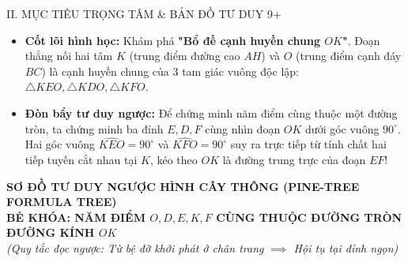 \documentclass[11pt,a4paper]{article}
\begin{document}
\vspace{1mm}

\begin{pedagogybox}{II. MỤC TIÊU TRỌNG TÂM \& BẢN ĐỒ TƯ DUY 9+}
\begin{itemize}[leftmargin=*, nosep]
    \item \textbf{Cốt lõi hình học:} Khám phá \textbf{"Bổ đề cạnh huyền chung $OK$"}. Đoạn thẳng nối hai tâm $K$ (trung điểm đường cao $AH$) và $O$ (trung điểm cạnh đáy $BC$) là cạnh huyền chung của 3 tam giác vuông độc lập: $\triangle KEO, \triangle KDO, \triangle KFO$.
    \item \textbf{Đòn bẩy tư duy ngược:} Để chứng minh năm điểm cùng thuộc một đường tròn, ta chứng minh ba đỉnh $E, D, F$ cùng nhìn đoạn $OK$ dưới góc vuông $90^\circ$. Hai góc vuông $\widehat{KEO} = 90^\circ$ và $\widehat{KFO} = 90^\circ$ suy ra trực tiếp từ tính chất hai tiếp tuyến cắt nhau tại $K$, kéo theo $OK$ là đường trung trực của đoạn $EF$!
\end{itemize}
\end{pedagogybox}

\newpage

\begin{center}
    {\Large\bfseries\color{blue!80!black} SƠ ĐỒ TƯ DUY NGƯỢC HÌNH CÂY THÔNG (PINE-TREE FORMULA TREE)}\\[1.5mm]
    {\large\bfseries BẺ KHÓA: NĂM ĐIỂM $O, D, E, K, F$ CÙNG THUỘC ĐƯỜNG TRÒN ĐƯỜNG KÍNH $OK$}\\[1mm]
    \textit{(Quy tắc đọc ngược: Từ bệ đỡ khởi phát ở chân trang $\implies$ Hội tụ tại đỉnh ngọn)}
\end{center}

\vspace{1mm}
\end{document}
